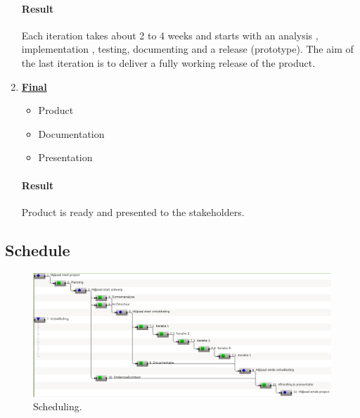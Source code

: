 \begin{enumerate}
	\paragraph{Result}
	Each iteration takes about 2 to 4 weeks and starts with an analysis , implementation , testing, documenting and a release (prototype). The aim of the last iteration is to deliver a fully working release of the product.
	
	\item \underline{\textbf{Final}}
	\begin{itemize}
		\item Product
		\item Documentation
		\item Presentation
	\end{itemize}
	\paragraph{Result}
	Product is ready and presented to the stakeholders.
\end{enumerate}

\subsection{Schedule}
  

  \begin{figure}
  	\centering
  	\includegraphics[scale=0.5]{Gantt.png}
  	\caption{\label{fig:Gantt Chart}Scheduling.}
  \end{figure}

